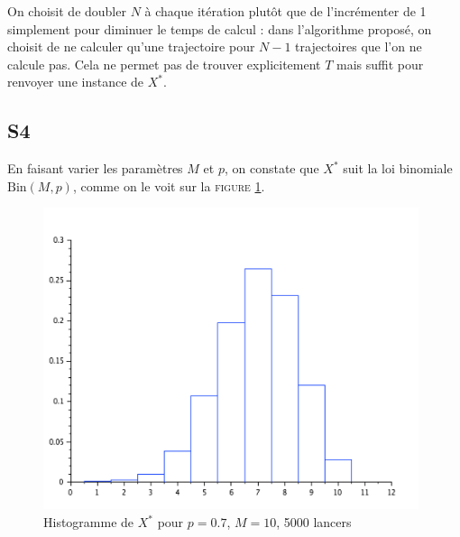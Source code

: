 \documentclass[a4paper,11pt]{article}
\begin{document}
On choisit de doubler $N$ à chaque itération plutôt que de l'incrémenter de 1 simplement pour diminuer le temps de calcul : dans l'algorithme proposé, on choisit de ne calculer qu'une trajectoire pour $N-1$ trajectoires que l'on ne calcule pas. Cela ne permet pas de trouver explicitement $T$ mais suffit pour renvoyer une instance de $X^*$.

\subsection*{S4}
En faisant varier les paramètres $M$ et $p$, on constate que $X^{*}$ suit la loi binomiale $\text{Bin}(M,p)$, comme on le voit sur la \textsc{figure} \ref{S4}. 
\begin{figure}[h]
\center
\includegraphics[width=11cm]{S4}
\caption{Histogramme de $X^{*}$ pour $p=0.7$, $M=10$, 5000 lancers}
\label{S4}
\end{figure}
\end{document}
